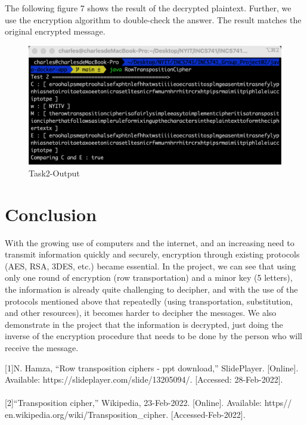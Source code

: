 \documentclass[twoside,twocolumn]{article}
\begin{document}
The following figure 7 shows the result of the decrypted plaintext. Further, we use the encryption algorithm to double-check the answer. The result matches the original encrypted message.

\begin{figure}[H]
  \centering
  \includegraphics[scale=0.35]{./Graphs/Figure2.0.png}
  \caption{Task2-Output}
  \label{fig:testfig1}
\end{figure}




\section{Conclusion}

With the growing use of computers and the internet, and an increasing need to transmit information quickly and securely, encryption through existing protocols (AES, RSA, 3DES, etc.) became essential. 
In the project, we can see that using only one round of encryption (row transportation) and a minor key (5 letters), the information is already quite challenging to decipher, and with the use of the protocols mentioned above that repeatedly (using transportation, substitution, and other resources), it becomes harder to decipher the messages. 
We also demonstrate in the project that the information is decrypted, just doing the inverse of the encryption procedure that needs to be done by the person who will receive the message.
 \\ 

\vspace*{5.5cm}
\begin{thebibliography}{} %

\footnotesize[1]N. Hamza, “Row transposition ciphers - ppt download,” SlidePlayer. [Online]. Available: https://slideplayer.com/slide/13205094/. [Accessed: 28-Feb-2022].  \\ \\

\footnotesize[2]“Transposition cipher,” Wikipedia, 23-Feb-2022. [Online]. Available: https\:// en.wikipedia.org/wiki/Transposition\_cipher. [Accessed-Feb-2022]. \\ \\


 
\end{thebibliography}


\end{document}
